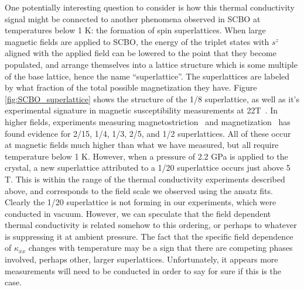 \documentclass{thesis-umich}
\begin{document}
One potentially interesting question to consider is how this thermal conductivity signal might be connected to another phenomena observed in SCBO at temperatures below 1 K: the formation of spin superlattices. When large magnetic fields are applied to SCBO, the energy of the triplet states with $s^z$ aligned with the applied field can be lowered to the point that they become populated, and arrange themselves into a lattice structure which is some multiple of the base lattice, hence the name ``superlattice''. The superlattices are labeled by what fraction of the total possible magnetization they have. Figure \ref{fig:SCBO_superlattice} shows the structure of the 1/8 superlattice, as well as it's experimental signature in magnetic susceptibility measurements at 22T~\cite{Haravifard2016}. In higher fields, experiments measuring magnetostriction~\cite{Jaime2012} and magnetization~\cite{Matsuda2013} has found evidence for 2/15, 1/4, 1/3, 2/5, and 1/2 superlattices. All of these occur at magnetic fields much higher than what we have measured, but all require temperature below 1 K. However, when a pressure of 2.2 GPa is applied to the crystal, a new superlattice attributed to a 1/20 superlattice occurs just above 5 T. This is within the range of the thermal conductivity experiments described above, and corresponds to the field scale we observed using the ansatz fits. Clearly the 1/20 superlattice is not forming in our experiments, which were conducted in vacuum. However, we can speculate that the field dependent thermal conductivity is related somehow to this ordering, or perhaps to whatever is suppressing it at ambient pressure. The fact that the specific field dependence of $\kappa_{xx}$ changes with temperature may be a sign that there are competing phases involved, perhaps other, larger superlattices. Unfortunately, it appears more measurements will need to be conducted in order to say for sure if this is the case. 
\end{document}
